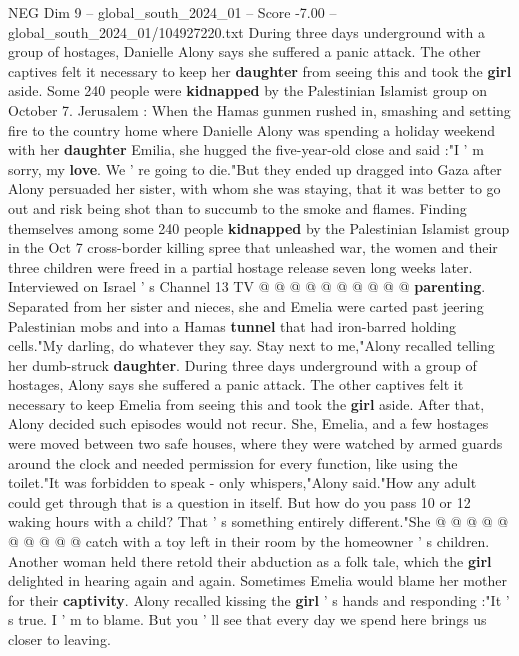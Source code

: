 \begin{textsample}{NEG Dim 9 – global\_south\_2024\_01 – Score -7.00 – global\_south\_2024\_01/104927220.txt}  \label{ex:f9_neg_422}
During three days underground with a group of hostages, Danielle Alony says she suffered a panic attack.
The other captives felt it necessary to keep her \textbf{daughter} from seeing this and took the \textbf{girl} aside.
Some 240 people were \textbf{kidnapped} by the Palestinian Islamist group on October 7.
Jerusalem : When the Hamas gunmen rushed in, smashing and setting fire to the country home where Danielle Alony was spending a holiday weekend with her \textbf{daughter} Emilia, she hugged the five-year-old close and said :"I ' m sorry, my \textbf{love}.
We ' re going to die."But they ended up dragged into Gaza after Alony persuaded her sister, with whom she was staying, that it was better to go out and risk being shot than to succumb to the smoke and flames.
Finding themselves among some 240 people \textbf{kidnapped} by the Palestinian Islamist group in the Oct 7 cross-border killing spree that unleashed war, the women and their three children were freed in a partial hostage release seven long weeks later.
Interviewed on Israel ' s Channel 13 TV @ @ @ @ @ @ @ @ @ @ \textbf{parenting}.
Separated from her sister and nieces, she and Emelia were carted past jeering Palestinian mobs and into a Hamas \textbf{tunnel} that had iron-barred holding cells."My darling, do whatever they say.
Stay next to me,"Alony recalled telling her dumb-struck \textbf{daughter}.
During three days underground with a group of hostages, Alony says she suffered a panic attack.
The other captives felt it necessary to keep Emelia from seeing this and took the \textbf{girl} aside.
After that, Alony decided such episodes would not recur.
She, Emelia, and a few hostages were moved between two safe houses, where they were watched by armed guards around the clock and needed permission for every function, like using the toilet."It was forbidden to speak - only whispers,"Alony said."How any adult could get through that is a question in itself.
But how do you pass 10 or 12 waking hours with a child?
That ' s something entirely different."She @ @ @ @ @ @ @ @ @ @ catch with a toy left in their room by the homeowner ' s children.
Another woman held there retold their abduction as a folk tale, which the \textbf{girl} delighted in hearing again and again.
Sometimes Emelia would blame her mother for their \textbf{captivity}.
Alony recalled kissing the \textbf{girl} ' s hands and responding :"It ' s true.
I ' m to blame.
But you ' ll see that every day we spend here brings us closer to leaving.

\end{textsample}
